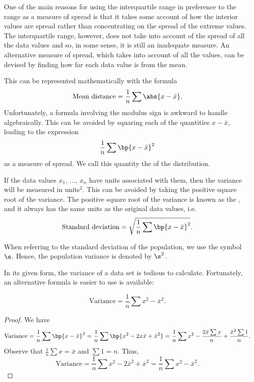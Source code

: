 One of the main reasons for using the interquartile range in preference to the range as a measure of spread is that it takes some account of how the interior values are spread rather than concentrating on the spread of the extreme values. The interquartile range, however, does not take into account of the spread of all the data values and so, in some sense, it is still an inadequate measure. An alternative measure of spread, which takes into account of all the values, can be devised by finding how far each data value is from the mean.

This can be represented mathematically with the formula \[\text{Mean distance} = \frac1n \sum \abs{x - \bar x}.\] Unfortunately, a formula involving the modulus sign is awkward to handle algebraically. This can be avoided by squaring each of the quantities $x - \bar x$, leading to the expression \[\frac1n \sum \bp{x - \bar x}^2\] as a measure of spread. We call this quantity the  of the distribution.

If the data values $x_1$, $\dots$, $x_n$ have units associated with them, then the variance will be measured in units$^2$. This can be avoided by taking the positive square root of the variance. The positive square root of the variance is known as the , and it always has the same units as the original data values, i.e. \[\text{Standard deviation} = \sqrt{\frac1n \sum \bp{x - \bar x}^2}.\]

When referring to the standard deviation of the population, we use the symbol $\s$. Hence, the population variance is denoted by $\s^2$.

In its given form, the variance of a data set is tedious to calculate. Fortunately, an alternative formula is easier to use is available:

\begin{proposition}
    \[\text{Variance} = \frac1n \sum x^2 - \bar{x}^2.\]
\end{proposition}
\begin{proof}
    We have \[\text{Variance} = \frac1n \sum \bp{x - \bar x}^2 = \frac1n \sum \bp{x^2 - 2x \bar{x} + \bar{x}^2} = \frac1n \sum x^2 - \frac{2\bar{x} \sum x}{n} + \frac{\bar{x}^2 \sum 1}{n}.\] Observe that $\frac1n \sum x = \bar x$ and $\sum 1 = n$. Thus, \[\text{Variance} = \frac1n \sum x^2 - 2\bar{x}^2 + \bar{x}^2 = \frac1n \sum x^2 - \bar{x}^2.\]
\end{proof}